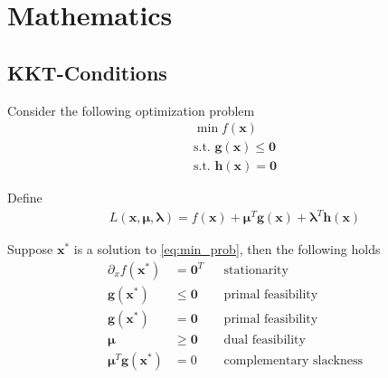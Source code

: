 \section{Mathematics}

\subsection{KKT-Conditions}
Consider the following optimization problem
\begin{equation}
\begin{aligned}
	\min f(\bm x) \\
	\textrm{s.t. } \bm{g}(\bm x) \leq \bm 0 \\
	\textrm{s.t. } \bm{h}(\bm x) = \bm 0 
\end{aligned}
\label{eq:min_prob}
\end{equation}

Define
\begin{align}
	L(\bm x, \bm \mu, \bm \lambda) = f(\bm x) + \bm{\mu}^T \bm{g}(\bm{x}) + \bm{\lambda}^T\bm{h}(\bm x)
\end{align}

Suppose $\bm{x}^*$ is a solution to \autoref{eq:min_prob}, then the following holds
\begin{align}
	\partial_x f(\bm{x}^*) &= \bm{0}^T & &\textrm{stationarity} \\
	\bm{g}(\bm{x}^*) &\leq \bm 0 & &\textrm{primal feasibility}\\
	\bm{g}(\bm{x}^*) &= \bm 0 & &\textrm{primal feasibility} \\
	\bm\mu &\geq \bm 0 & &\textrm{dual feasibility} \\
	\bm{\mu}^T \bm{g}(\bm{x}^*) &= 0 & &\textrm{complementary slackness}
\end{align}

